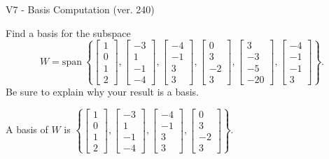 \begin{exercise}
  \begin{exerciseTitle}V7 - Basis Computation (ver. 240)\end{exerciseTitle}
  \begin{exerciseStatement}
    Find a basis for the subspace 
\[W=\mathrm{span}\ \left\{\left[\begin{array}{r}
1 \\
0 \\
1 \\
2
\end{array}\right] , \left[\begin{array}{r}
-3 \\
1 \\
-1 \\
-4
\end{array}\right] , \left[\begin{array}{r}
-4 \\
-1 \\
3 \\
3
\end{array}\right] , \left[\begin{array}{r}
0 \\
3 \\
-2 \\
3
\end{array}\right] , \left[\begin{array}{r}
3 \\
-3 \\
-5 \\
-20
\end{array}\right] , \left[\begin{array}{r}
-4 \\
-1 \\
-1 \\
3
\end{array}\right]\right\}.\]
 Be sure to explain why your result is a basis.


  \end{exerciseStatement}
  \begin{exerciseAnswer}
   A basis of \(W\) is  \(\left\{\left[\begin{array}{r}
1 \\
0 \\
1 \\
2
\end{array}\right] , \left[\begin{array}{r}
-3 \\
1 \\
-1 \\
-4
\end{array}\right] , \left[\begin{array}{r}
-4 \\
-1 \\
3 \\
3
\end{array}\right] , \left[\begin{array}{r}
0 \\
3 \\
-2 \\
3
\end{array}\right]\right\}\).
  


  \end{exerciseAnswer}
\end{exercise}